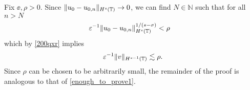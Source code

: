 Fix $\ee, \rho > 0$. Since $\|u_0 -
u_{0,n} \|_{H^s(\mathbb{T})} \to 0$, we
can find $N \in \mathbb{N}$ such that for all $n > N$
%
%
\begin{equation*}
\begin{split}
\varepsilon^{-1} \|u_0-u_{0,n}\|_{H^s(\mathbb{T})}^{1/(s-\sigma)}
& < \rho
\label{uniform_n}
\end{split}
\end{equation*}
%
%
which by \eqref{200qxr} implies
%
%
\begin{equation}
	\label{end-decay}
	\begin{split}
		\varepsilon^{-1} \|v\|_{H^{s-1}(\mathbb{T})} \lesssim \rho.
	\end{split}
\end{equation}
%
%
%
%
Since $\rho$ can be chosen to be arbitrarily small, the remainder of the 
proof is analogous to that of \eqref{enough_to_prove1}. \qquad \qedsymbol
%
%
%
%

